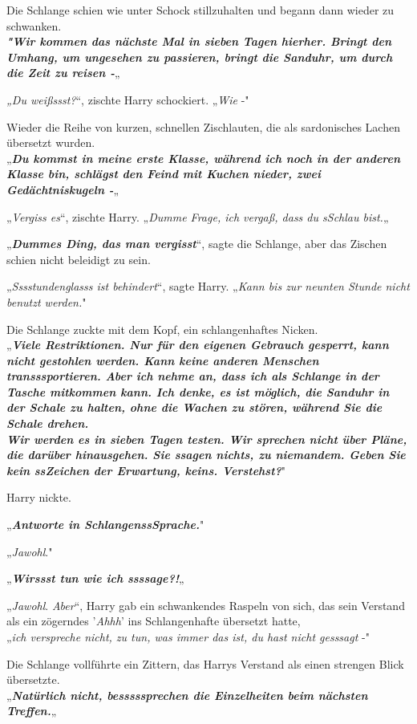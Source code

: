 {Die Schlange schien wie unter Schock stillzuhalten und begann dann wieder zu schwanken.\\ \textbf{\emph{"Wir kommen das nächste Mal in sieben Tagen hierher. Bringt den Umhang, um ungesehen zu passieren, bringt die Sanduhr, um durch die Zeit zu reisen -}}„

\emph{„Du weißssst?}“, zischte Harry schockiert. „\emph{Wie} -"

Wieder die Reihe von kurzen, schnellen Zischlauten, die als sardonisches Lachen übersetzt wurden.\\ „\textbf{\emph{Du kommst in meine erste Klasse, während ich noch in der anderen Klasse bin, schlägst den Feind mit Kuchen nieder, zwei Gedächtniskugeln -}}„

„\emph{Vergiss es}“, zischte Harry. „\emph{Dumme Frage, ich vergaß, dass du sSchlau bist.}„

„\textbf{\emph{Dummes Ding, das man vergisst}}“, sagte die Schlange, aber das Zischen schien nicht beleidigt zu sein.

„\emph{Sssstundenglasss ist behindert}“, sagte Harry. „\emph{Kann bis zur neunten Stunde nicht benutzt werden.}"

Die Schlange zuckte mit dem Kopf, ein schlangenhaftes Nicken.\\ „\textbf{\emph{Viele Restriktionen. Nur für den eigenen Gebrauch gesperrt, kann nicht gestohlen werden. Kann keine anderen Menschen transssportieren. Aber ich nehme an, dass ich als Schlange in der Tasche mitkommen kann. Ich denke, es ist möglich, die Sanduhr in der Schale zu halten, ohne die Wachen zu stören, während Sie die Schale drehen.\\ Wir werden es in sieben Tagen testen. Wir sprechen nicht über Pläne, die darüber hinausgehen. Sie ssagen nichts, zu niemandem. Geben Sie kein ssZeichen der Erwartung, keins. Verstehst?}}"

Harry nickte.

„\textbf{\emph{Antworte in SchlangenssSprache.}}"

„\emph{Jawohl}."

„\textbf{\emph{Wirssst tun wie ich ssssage?!}}„

„\emph{Jawohl}. \emph{Aber}“, Harry gab ein schwankendes Raspeln von sich, das sein Verstand als ein zögerndes '\emph{Ahhh}' ins Schlangenhafte übersetzt hatte,\\ „\emph{ich verspreche nicht, zu tun, was immer das ist, du hast nicht gesssagt} -"

Die Schlange vollführte ein Zittern, das Harrys Verstand als einen strengen Blick übersetzte.\\ „\textbf{\emph{Natürlich nicht, besssssprechen die Einzelheiten beim nächsten Treffen.}}„

}
